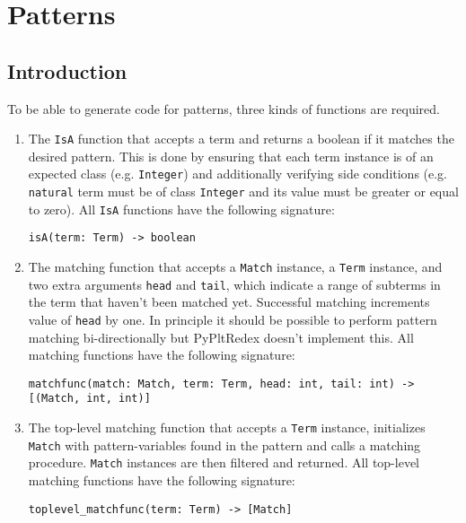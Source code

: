 \section{Patterns}

\subsection{Introduction}

To be able to generate code for patterns, three kinds of functions are required.

\begin{enumerate}
\item
The \texttt{IsA} function that accepts a term and returns a boolean if it matches the desired pattern. This is done by ensuring that each term instance is of an expected class (e.g. \texttt{Integer}) and additionally verifying side conditions (e.g. \texttt{natural} term must be of class \texttt{Integer} and its value must be greater or equal to zero). All \texttt{IsA} functions have the following signature:

\begin{verbatim}
isA(term: Term) -> boolean
\end{verbatim}

\item
The matching function that accepts a \texttt{Match} instance, a \texttt{Term} instance, and two extra arguments \texttt{head} and \texttt{tail}, which indicate a range of subterms in the term that haven't been matched yet. Successful matching increments value of \texttt{head} by one. In principle it should be possible to perform pattern matching bi-directionally but PyPltRedex doesn't implement this. All matching functions have the following signature:

\begin{verbatim}
matchfunc(match: Match, term: Term, head: int, tail: int) -> [(Match, int, int)]
\end{verbatim}

\item
The top-level matching function that accepts a \texttt{Term} instance, initializes \texttt{Match} with pattern-variables found in the pattern and calls a matching procedure. \texttt{Match} instances are then filtered and returned. All top-level matching functions have the following signature:
\begin{verbatim}
toplevel_matchfunc(term: Term) -> [Match]
\end{verbatim}
\end{enumerate}


